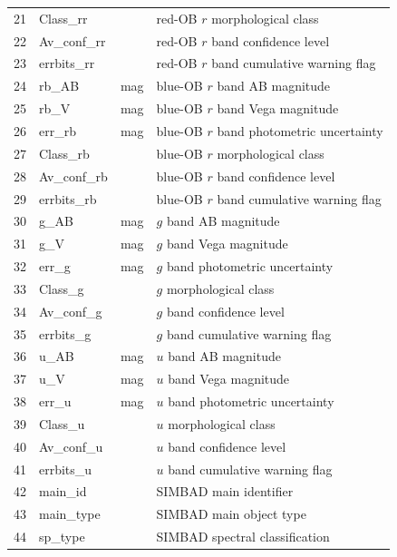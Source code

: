 \documentclass[11pt]{article}
\begin{document}
\begin{table}[htbp]
{\begin{tabular}{llcl}
21 & Class\_rr &    & red-OB $r$ morphological class \\
22 & Av\_conf\_rr &     & red-OB $r$ band confidence level \\
23 & errbits\_rr &     & red-OB $r$ band cumulative warning flag \\
24 & rb\_AB & mag &  blue-OB $r$ band AB magnitude \\
25 & rb\_V & mag & blue-OB $r$ band Vega magnitude  \\
26 & err\_rb & mag &  blue-OB $r$ band photometric uncertainty \\ 
27 & Class\_rb &    & blue-OB $r$ morphological class \\
28 & Av\_conf\_rb &     & blue-OB $r$ band confidence level \\
29 & errbits\_rb &     & blue-OB $r$ band cumulative warning flag \\
30 & g\_AB & mag &  $g$ band AB magnitude \\
31 & g\_V & mag & $g$ band Vega magnitude \\
32 & err\_g & mag &  $g$ band photometric uncertainty \\ 
33 & Class\_g &    & $g$ morphological class \\
34 & Av\_conf\_g &     & $g$ band confidence level \\
35 & errbits\_g &     & $g$ band cumulative warning flag   \\
36 & u\_AB & mag &  $u$ band AB magnitude \\
37 & u\_V & mag & $u$ band Vega magnitude \\
38 & err\_u & mag &  $u$ band photometric uncertainty \\ 
39 & Class\_u &    & $u$ morphological class \\
40 & Av\_conf\_u &     & $u$ band confidence level \\
41 & errbits\_u &     & $u$ band cumulative warning flag   \\
42 & main\_id &    & SIMBAD main identifier \\
43 & main\_type &    & SIMBAD main object type \\
44 & sp\_type &    &  SIMBAD spectral classification \\
\hline
\end{tabular}
}
\end{table}
\end{document}
